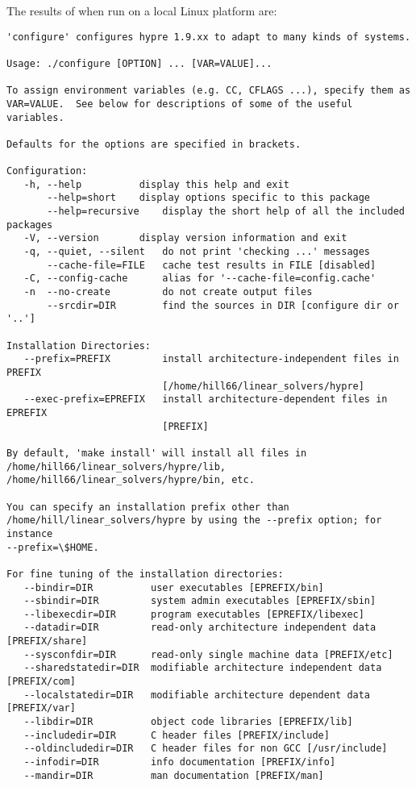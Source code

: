 The results of  when run on a local Linux platform are:
\begin{verbatim}
'configure' configures hypre 1.9.xx to adapt to many kinds of systems.

Usage: ./configure [OPTION] ... [VAR=VALUE]...

To assign environment variables (e.g. CC, CFLAGS ...), specify them as
VAR=VALUE.  See below for descriptions of some of the useful variables.

Defaults for the options are specified in brackets.

Configuration:
   -h, --help		   display this help and exit
       --help=short	   display options specific to this package
       --help=recursive	   display the short help of all the included packages
   -V, --version	   display version information and exit
   -q, --quiet, --silent   do not print 'checking ...' messages
       --cache-file=FILE   cache test results in FILE [disabled]
   -C, --config-cache      alias for '--cache-file=config.cache'
   -n  --no-create         do not create output files
       --srcdir=DIR        find the sources in DIR [configure dir or '..']

Installation Directories:
   --prefix=PREFIX         install architecture-independent files in PREFIX
                           [/home/hill66/linear_solvers/hypre]
   --exec-prefix=EPREFIX   install architecture-dependent files in EPREFIX 
                           [PREFIX]

By default, 'make install' will install all files in
/home/hill66/linear_solvers/hypre/lib, /home/hill66/linear_solvers/hypre/bin, etc.

You can specify an installation prefix other than
/home/hill/linear_solvers/hypre by using the --prefix option; for instance
--prefix=\$HOME.

For fine tuning of the installation directories:
   --bindir=DIR          user executables [EPREFIX/bin]
   --sbindir=DIR         system admin executables [EPREFIX/sbin]
   --libexecdir=DIR      program executables [EPREFIX/libexec]
   --datadir=DIR         read-only architecture independent data [PREFIX/share]
   --sysconfdir=DIR      read-only single machine data [PREFIX/etc]
   --sharedstatedir=DIR  modifiable architecture independent data [PREFIX/com]
   --localstatedir=DIR   modifiable architecture dependent data [PREFIX/var]
   --libdir=DIR          object code libraries [EPREFIX/lib]
   --includedir=DIR      C header files [PREFIX/include]
   --oldincludedir=DIR   C header files for non GCC [/usr/include]
   --infodir=DIR         info documentation [PREFIX/info]
   --mandir=DIR          man documentation [PREFIX/man]


\end{verbatim}
